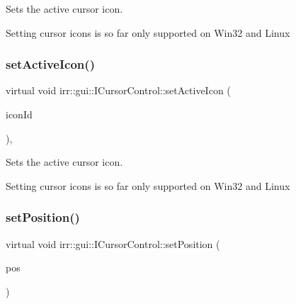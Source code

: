 Sets the active cursor icon. 

Setting cursor icons is so far only supported on Win32 and Linux \mbox{\label{classirr_1_1gui_1_1ICursorControl_af394700d5279b13cc0f2bcdad679469c}} 
\subsubsection{\texorpdfstring{set\+Active\+Icon()}{setActiveIcon()}\hspace{0.1cm}{\footnotesize\ttfamily [2/2]}}
{\footnotesize\ttfamily virtual void irr\+::gui\+::\+I\+Cursor\+Control\+::set\+Active\+Icon (\begin{DoxyParamCaption}\item[{\hyperlink{namespaceirr_1_1gui_aefee802dd632c5735703e40ef40f879b}{E\+C\+U\+R\+S\+O\+R\+\_\+\+I\+C\+ON}}]{icon\+Id }\end{DoxyParamCaption})\hspace{0.3cm}{\ttfamily [inline]}, {\ttfamily [virtual]}}



Sets the active cursor icon. 

Setting cursor icons is so far only supported on Win32 and Linux \mbox{\label{classirr_1_1gui_1_1ICursorControl_a951b5afe97fa21d98ce5360d96314306}} 
\subsubsection{\texorpdfstring{set\+Position()}{setPosition()}\hspace{0.1cm}{\footnotesize\ttfamily [1/8]}}
{\footnotesize\ttfamily virtual void irr\+::gui\+::\+I\+Cursor\+Control\+::set\+Position (\begin{DoxyParamCaption}\item[{const core\+::position2d$<$ \hyperlink{namespaceirr_a0277be98d67dc26ff93b1a6a1d086b07}{f32} $>$ \&}]{pos }\end{DoxyParamCaption})\hspace{0.3cm}{\ttfamily [pure virtual]}}



